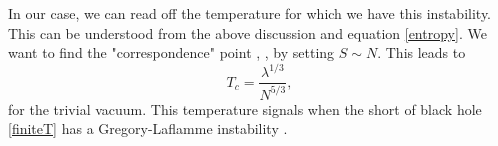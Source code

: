 \documentclass[11pt,english]{article}
\newcommand{\be}{\begin{equation}}
\newcommand{\ee}{\end{equation}}
\numberwithin{equation}{section}
\begin{document}
  
  
  In our case, we can read off the temperature for which we have this instability. This can be understood from the above discussion and equation \eqref{entropy}. We want to find the "correspondence" point \cite{Horowitz1997}, \cite{HorowitzCorr}, by setting $S\sim N$. This leads to 
  \be 
  T_c=\frac{\lambda^{1/3}}{N^{5/3}},
  \ee 
  for the trivial vacuum. This temperature signals when the short of black hole \eqref{finiteT} has a Gregory-Laflamme instability \cite{Gregory93}.
 
\nocite{}


\end{document}

